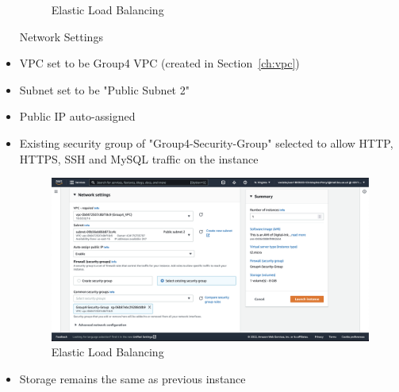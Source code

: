 \begin{itemize}
\begin{figure}[!htbp]
	      \caption{Elastic Load Balancing}
	      \label{fig:elb-type-and-keypair}
	\end{figure}
	Network Settings
	\item VPC set to be Group4 VPC  (created in Section~\ref{ch:vpc})
	\item Subnet set to be "Public Subnet 2"
	\item Public IP auto-assigned
	\item Existing security group of "Group4-Security-Group" selected to allow HTTP, HTTPS, SSH and MySQL traffic on the
	      instance \begin{figure}[!htbp]
	      \centering
	      \includegraphics[width=\textwidth]{resources/elb/elb-instance-2-network-settings.png}
	      \caption{Elastic Load Balancing}
	      \label{fig:elb-instance-2-network-setting}
	\end{figure}
	\item Storage remains the same as previous instance


\end{itemize}
